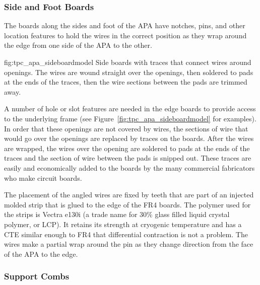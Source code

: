 \subsubsection{Side and Foot Boards}

The boards along the sides and foot of the APA have notches, pins, and other location features to hold the wires in the correct position as they wrap around the edge from one side of the APA to the other.  

\begin{dunefigure}{fig:tpc_apa_sideboardmodel}
{Side boards with traces that connect wires around openings.  The wires are wound straight over the openings, then soldered to pads at the ends of the traces, then the wire sections between the pads are trimmed away.}
\setlength{\fboxsep}{0pt}
\setlength{\fboxrule}{0.5pt}
\quad
{}
\end{dunefigure}

A number of hole or slot features are needed in the edge boards to provide access to the underlying frame (see Figure~\ref{fig:tpc_apa_sideboardmodel} for examples).  In order that these openings are not covered by wires, the sections of wire that would go over the openings are replaced by traces on the boards.  After the wires are wrapped, the wires over the opening are soldered to pads at the ends of the traces and the section of wire between the pads is snipped out.  These traces are easily and economically added to the boards by the many commercial fabricators who make circuit boards. 

The placement of the angled wires are fixed by teeth that are part of an injected molded strip that is glued to the edge of the FR4 boards.  The polymer used for the strips is Vectra e130i (a trade name for 30$\%$ glass filled liquid crystal polymer, or LCP). It retains its strength at cryogenic temperature and has a CTE similar enough to FR4 that differential contraction is not a problem.  The wires make a partial wrap around the pin as they change direction from the face of the APA to the edge.

\subsubsection{Support Combs}
\label{sec:combs}

